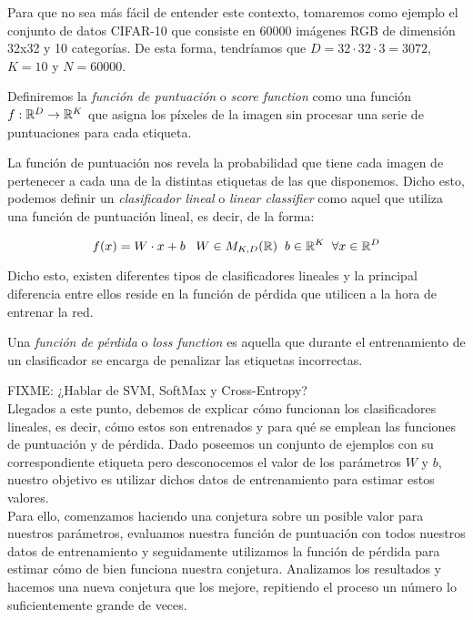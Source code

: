 Para que no sea más fácil de entender este contexto, tomaremos como ejemplo el conjunto de datos CIFAR-10 que consiste en 60000 imágenes RGB de dimensión 32x32 y 10 categorías. De esta forma, tendríamos que $D=32\cdot 32 \cdot 3 = 3072$, $K=10$ y $N=60000$.

\begin{definicion}\label{def:ScoreFunction}
Definiremos la \emph{función de puntuación} o \emph{score function} como una función $f:\mathbb{R}^D \to \mathbb{R}^K$ que asigna los píxeles de la imagen sin procesar una serie de puntuaciones para cada etiqueta.
\end{definicion}

La función de puntuación nos revela la probabilidad que tiene cada imagen de pertenecer a cada una de la distintas etiquetas de las que disponemos. Dicho esto, podemos definir un \emph{clasificador lineal} o \emph{linear classifier} \label{def:LinearClassifier} como aquel que utiliza una función de puntuación lineal, es decir, de la forma:

$$f(x)=W\cdot x+ b\; \; \; W\in M_{K,D}(\mathbb{R}) \;\; b \in \mathbb{R}^K \;\; \forall x\in \mathbb{R}^D$$

Dicho esto, existen diferentes tipos de clasificadores lineales y la principal diferencia entre ellos reside en la función de pérdida que utilicen a la hora de entrenar la red.

\begin{definicion}\label{def:LossFunction}
Una \emph{función de pérdida} o \emph{loss function} es aquella que durante el entrenamiento de un clasificador se encarga de penalizar las etiquetas incorrectas.
\end{definicion}

FIXME: ¿Hablar de SVM, SoftMax y Cross-Entropy?\\

Llegados a este punto, debemos de explicar cómo funcionan los clasificadores lineales, es decir, cómo estos son entrenados y para qué se emplean las funciones de puntuación y de pérdida. Dado poseemos un conjunto de ejemplos con su correspondiente etiqueta pero desconocemos el valor de los parámetros $W$ y $b$, nuestro objetivo es utilizar dichos datos de entrenamiento para estimar estos valores. \\

Para ello, comenzamos haciendo una conjetura sobre un posible valor para nuestros parámetros, evaluamos nuestra función de puntuación con todos nuestros datos de entrenamiento y seguidamente utilizamos la función de pérdida para estimar cómo de bien funciona nuestra conjetura. Analizamos los resultados y hacemos una nueva conjetura que los mejore, repitiendo el proceso un número lo suficientemente grande de veces.\\


